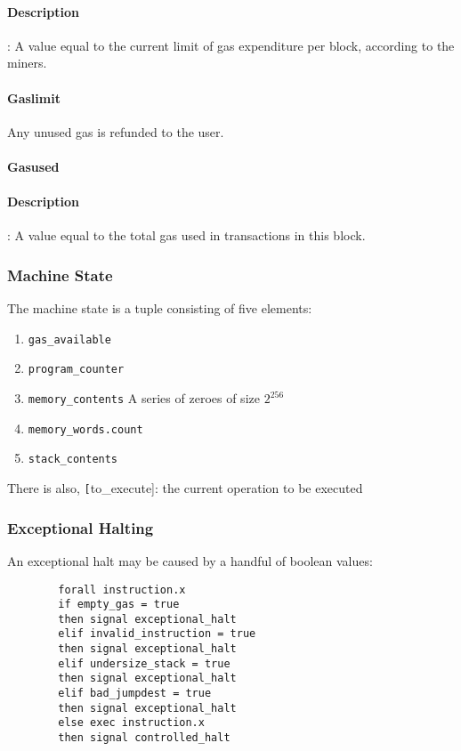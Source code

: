 \documentclass[10pt,a4paper,leqno,bibliography=totoc]{scrartcl}
\newenvironment{alphafootnotes}
{\par\edef\savedfootnotenumber{\number\value{footnote}}
\renewcommand{\thefootnote}{\alph{footnote}}
\setcounter{footnote}{0}}
{\par\setcounter{footnote}{\savedfootnotenumber}}
\begin{document}
\begin{alphafootnotes}
\begin{multicols*}{2}
					\paragraph{Description}: A value equal to the current limit of gas expenditure per block, according to the miners. 
				\paragraph{Gaslimit}
					Any unused gas is refunded to the user.

				\paragraph{Gasused}
		\paragraph{Description}: A value equal to the total gas used in transactions in this block. 

			\subsubsection{Machine State}
			The machine state is a tuple consisting of five elements:
		
		\begin{enumerate}
			\item \texttt{gas\_available}
			\item \texttt{program\_counter}
			\item \texttt{memory\_contents} A series of zeroes of size $2^{256}$
			\item \texttt{memory\_words.count}
			\item \texttt{stack\_contents}
		\end{enumerate}
		
		There is also, \texttt[to\_execute]: the current operation to be executed
		
		\subsubsection{Exceptional Halting}
		An exceptional halt may be caused by a handful of boolean values:
		
		\begin{verbatim}
		forall instruction.x
		if empty_gas = true
		then signal exceptional_halt
		elif invalid_instruction = true
		then signal exceptional_halt
		elif undersize_stack = true
		then signal exceptional_halt
		elif bad_jumpdest = true
		then signal exceptional_halt
		else exec instruction.x	
		then signal controlled_halt
		\end{verbatim}
		

\end{multicols*}
\end{alphafootnotes}
\end{document}
